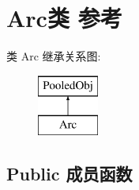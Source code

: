 \hypertarget{class_arc}{}\section{Arc类 参考}
\label{class_arc}
类 Arc 继承关系图\+:\begin{figure}[H]
\begin{center}
\leavevmode
\includegraphics[height=2.000000cm]{class_arc}
\end{center}
\end{figure}
\subsection*{Public 成员函数}
